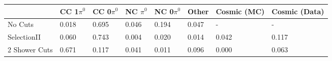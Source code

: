 \begin{table*}
\centering
{}
 \begin{tabular}{| l | l | l |l|l|l|l|l|}
 \hline
  & CC 1$\pi^0$ & CC 0$\pi^0$ & NC $\pi^0$ & NC 0$\pi^0$ & Other& Cosmic (MC) & Cosmic (Data) \\ [0.1ex] \hline
No Cuts  & 0.018 &  0.695 & 0.046 & 0.194  & 0.047 & -&-\\
SelectionII & 0.060 & 0.743 & 0.004 & 0.020 & 0.014 & 0.042 & 0.117  \\ 
2 Shower Cuts  & 0.671 & 0.117 & 0.041 & 0.011 & 0.096 & 0.000 & 0.063 \\ \hline
\end{tabular}
\end{table*}

